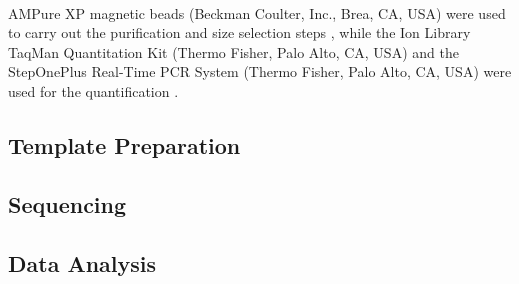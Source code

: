 AMPure XP\textsuperscript\textregistered{} magnetic beads (Beckman Coulter, Inc., Brea, CA, USA) were used to carry out the purification and size selection steps \cite{AMPure}, while the Ion Library TaqMan\texttrademark{} Quantitation Kit (Thermo Fisher, Palo Alto, CA, USA) and the StepOnePlus\texttrademark{} Real-Time PCR System (Thermo Fisher, Palo Alto, CA, USA) were used for the quantification \cite{Quantification_TaqMan, qPCR_StepOnePlus}.

\subsection{Template Preparation}







\subsection{Sequencing}


\subsection{Data Analysis}


